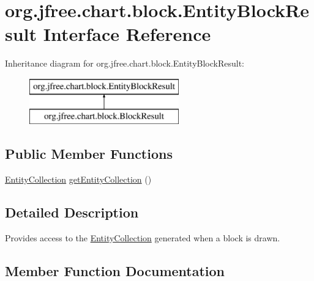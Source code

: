 \hypertarget{interfaceorg_1_1jfree_1_1chart_1_1block_1_1_entity_block_result}{}\section{org.\+jfree.\+chart.\+block.\+Entity\+Block\+Result Interface Reference}
\label{interfaceorg_1_1jfree_1_1chart_1_1block_1_1_entity_block_result}
Inheritance diagram for org.\+jfree.\+chart.\+block.\+Entity\+Block\+Result\+:\begin{figure}[H]
\begin{center}
\leavevmode
\includegraphics[height=2.000000cm]{interfaceorg_1_1jfree_1_1chart_1_1block_1_1_entity_block_result}
\end{center}
\end{figure}
\subsection*{Public Member Functions}
\begin{DoxyCompactItemize}
\item 
\mbox{\hyperlink{interfaceorg_1_1jfree_1_1chart_1_1entity_1_1_entity_collection}{Entity\+Collection}} \mbox{\hyperlink{interfaceorg_1_1jfree_1_1chart_1_1block_1_1_entity_block_result_ad9daa05fb5b1282fa3a2cf32c74f3070}{get\+Entity\+Collection}} ()
\end{DoxyCompactItemize}


\subsection{Detailed Description}
Provides access to the \mbox{\hyperlink{}{Entity\+Collection}} generated when a block is drawn. 

\subsection{Member Function Documentation}
\mbox{\label{interfaceorg_1_1jfree_1_1chart_1_1block_1_1_entity_block_result_ad9daa05fb5b1282fa3a2cf32c74f3070}} 
